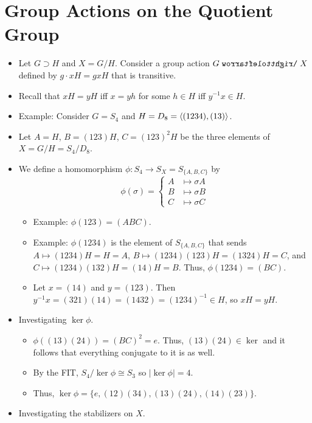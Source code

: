 \documentclass[../notes.tex]{subfiles}
\begin{document}
\section{Group Actions on the Quotient Group}
\begin{itemize}
    \item {}Let $G\supset H$ and $X=G/H$. Consider a group action $G\acts X$ defined by $g\cdot xH=gxH$ that is transitive.
    \item Recall that $xH=yH$ iff $x=yh$ for some $h\in H$ iff $y^{-1}x\in H$.
    \item Example: Consider $G=S_4$ and $H=D_8=\left\langle{(1234),(13)}\right\rangle$.
    \item Let $A=H$, $B=(123)H$, $C=(123)^2H$ be the three elements of $X=G/H=S_4/D_8$.
    \item We define a homomorphism $\phi:S_4\to S_X=S_{\{A,B,C\}}$ by
    \begin{equation*}
        \phi(\sigma) =
        \begin{cases}
            A &\mapsto \sigma A\\
            B &\mapsto \sigma B\\
            C &\mapsto \sigma C
        \end{cases}
    \end{equation*}
    \begin{itemize}
        \item Example: $\phi(123)=(ABC)$.
        \item Example: $\phi(1234)$ is the element of $S_{\{A,B,C\}}$ that sends $A\mapsto(1234)H=H=A$, $B\mapsto(1234)(123)H=(1324)H=C$, and $C\mapsto(1234)(132)H=(14)H=B$. Thus, $\phi(1234)=(BC)$.
        \item Let $x=(14)$ and $y=(123)$. Then $y^{-1}x=(321)(14)=(1432)=(1234)^{-1}\in H$, so $xH=yH$.
    \end{itemize}
    \item Investigating $\ker\phi$.
    \begin{itemize}
        \item $\phi((13)(24))=(BC)^2=e$. Thus, $(13)(24)\in\ker$ and it follows that everything conjugate to it is as well.
        \item By the FIT, $S_4/\ker\phi\cong S_3$ so $|\ker\phi|=4$.
        \item Thus, $\ker\phi=\{e,(12)(34),(13)(24),(14)(23)\}$.
    \end{itemize}
    \item Investigating the stabilizers on $X$.
    \begin{itemize}

\end{itemize}
\end{itemize}
\end{document}
